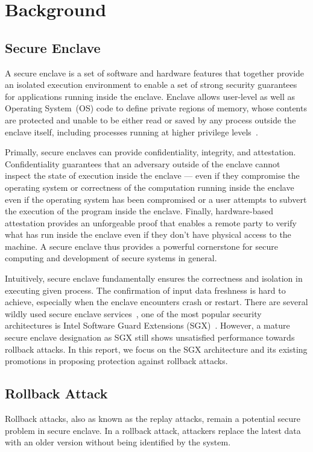 \section{Background}
\subsection{Secure Enclave}
A secure enclave is a set of software and hardware features that together provide an isolated execution environment to enable a set of strong security guarantees for applications running inside the enclave. Enclave allows user-level as well as Operating System~(OS) code to define private regions of memory, whose contents are protected and unable to be either read or saved by any process outside the enclave itself, including processes running at higher privilege levels~\cite{}. 

Primally, secure enclaves can provide confidentiality, integrity, and attestation. Confidentiality guarantees that an adversary outside of the enclave cannot inspect the state of execution inside the enclave — even if they compromise the operating system or correctness of the computation running inside the enclave even if the operating system has been compromised or a user attempts to subvert the execution of the program inside the enclave. Finally, hardware-based attestation provides an unforgeable proof that enables a remote party to verify what has run inside the enclave even if they don’t have physical access to the machine. A secure enclave thus provides a powerful cornerstone for secure computing and development of secure systems in general. 


Intuitively, secure enclave fundamentally ensures the correctness and isolation in executing given process. The confirmation of input data freshness is hard to achieve, especially when the enclave encounters crash or restart. There are several wildly used secure enclave services~\cite{}, one of the most popular security architectures is Intel Software Guard Extensions (SGX)~\cite{}. However, a mature secure enclave designation as SGX still shows unsatisfied performance towards rollback attacks. In this report, we focus on the SGX architecture and its existing promotions in proposing protection against rollback attacks.


\subsection{Rollback Attack}

Rollback attacks, also as known as the replay attacks, remain a potential secure problem in secure enclave. In a rollback attack, attackers replace the latest data with an older version without being identified by the system. 

